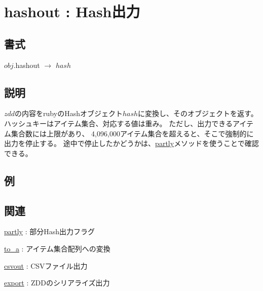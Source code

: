 
\section{hashout : Hash出力\label{sect:hashout}}
\subsection*{書式}
$obj$.hashout $\rightarrow$ $hash$

\subsection*{説明}
$zdd$の内容をrubyのHashオブジェクト$hash$に変換し、そのオブジェクトを返す。
ハッシュキーはアイテム集合、対応する値は重み。
ただし、出力できるアイテム集合数には上限があり、
4,096,000アイテム集合を超えると、そこで強制的に出力を停止する。
途中で停止したかどうかは、\hyperref[sect:partly]{partly}メソッドを使うことで確認できる。

\subsection*{例}


\subsection*{関連}
\hyperref[sect:partly]{partly} : 部分Hash出力フラグ

\hyperref[sect:to_a]{to\_a} : アイテム集合配列への変換

\hyperref[sect:csvout]{csvout} : CSVファイル出力

\hyperref[sect:export]{export} : ZDDのシリアライズ出力

